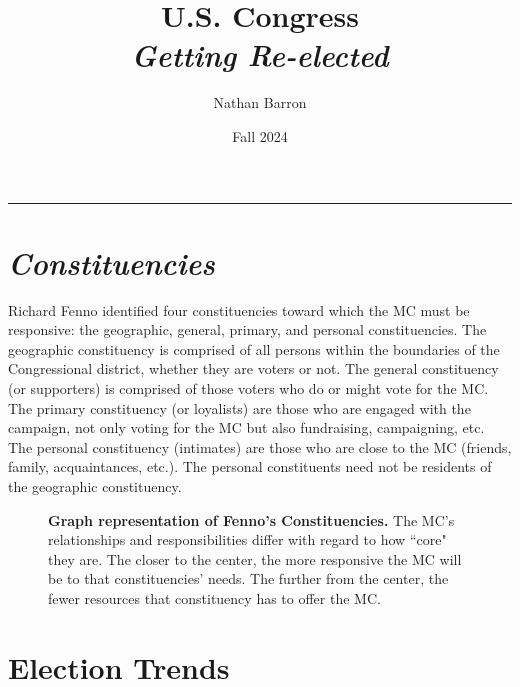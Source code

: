 \documentclass[10pt]{article}
\title{\textbf{U.S. Congress}\\\textit{Getting Re-elected}}
\author{Nathan Barron}
\date{Fall 2024}
\begin{document}
\maketitle
\tableofcontents
\vspace{.25in}
\hrule
\vspace{.25in}

\section{\textit{Constituencies}}

Richard Fenno identified four constituencies toward which the MC must be responsive: the geographic, general, primary, and personal constituencies. The geographic constituency is comprised of all persons within the boundaries of the Congressional district, whether they are voters or not. The general constituency (or supporters) is comprised of those voters who do or might vote for the MC. The primary constituency (or loyalists) are those who are engaged with the campaign, not only voting for the MC but also fundraising, campaigning, etc. The personal constituency (intimates) are those who are close to the MC (friends, family, acquaintances, etc.). The personal constituents need not be residents of the geographic constituency. 

\begin{figure}[h]
\centering
    \caption{\textbf{Graph representation of Fenno's Constituencies.} The MC's relationships and responsibilities differ with regard to how ``core" they are. The closer to the center, the more responsive the MC will be to that constituencies' needs. The further from the center, the fewer resources that constituency has to offer the MC.}
\end{figure}

\section{Election Trends}
\end{document}
